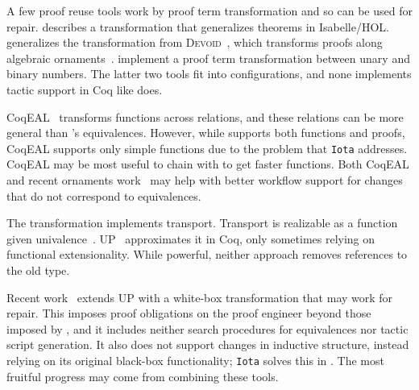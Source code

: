 A few proof reuse tools work by proof term transformation and so can be used for repair.
\citet{Johnsen2004} describes a transformation that generalizes theorems in Isabelle/HOL.
\toolname generalizes the transformation from \textsc{Devoid}~\cite{Ringer2019},
which transforms proofs along algebraic ornaments~\cite{mcbride}.
\citet{magaud2000changing} implement a proof term transformation between
unary and binary numbers. 
The latter two tools fit into \toolname configurations,
and none implements tactic support in Coq like \toolname does.

CoqEAL~\cite{cohen:hal-01113453} transforms functions across relations,
and these relations can be more general than \toolname's equivalences.
However, while \toolname supports both functions and proofs, CoqEAL supports only simple functions
due to the problem that \lstinline{Iota} addresses.
CoqEAL may be most useful to chain with \toolname to get faster functions.
Both CoqEAL and recent ornaments work~\cite{williamsphd} may help with
better workflow support for changes that do not correspond to equivalences.

The \toolname transformation implements transport.
Transport is realizable as a function given univalence~\cite{univalent2013homotopy}.
UP~\cite{tabareau2017equivalences} approximates it
in Coq, only sometimes relying on functional extensionality.
While powerful, neither approach removes references to the old type. %

Recent work~\cite{tabareau2019marriage} extends UP with 
a white-box transformation that may work for repair.
This imposes proof obligations on the proof engineer beyond those imposed by \toolname,
and it includes neither search procedures for equivalences nor tactic script generation.
It also does not support changes in inductive structure,
instead relying on its original black-box functionality;
\lstinline{Iota} solves this in \toolname. %
The most fruitful progress may come from combining these tools. %

